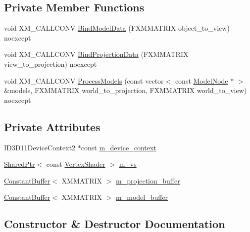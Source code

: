 \subsection*{Private Member Functions}
\begin{DoxyCompactItemize}
\item 
void X\+M\+\_\+\+C\+A\+L\+L\+C\+O\+NV \hyperlink{classmage_1_1_depth_pass_ae6662a200915bd6e6842d76f47abd6c4}{Bind\+Model\+Data} (F\+X\+M\+M\+A\+T\+R\+IX object\+\_\+to\+\_\+view) noexcept
\item 
void X\+M\+\_\+\+C\+A\+L\+L\+C\+O\+NV \hyperlink{classmage_1_1_depth_pass_a38ff8d33518769575a945f4908993eb0}{Bind\+Projection\+Data} (F\+X\+M\+M\+A\+T\+R\+IX view\+\_\+to\+\_\+projection) noexcept
\item 
void X\+M\+\_\+\+C\+A\+L\+L\+C\+O\+NV \hyperlink{classmage_1_1_depth_pass_a00a2eaabd0d0363cf58998a46688c490}{Process\+Models} (const vector$<$ const \hyperlink{classmage_1_1_model_node}{Model\+Node} $\ast$ $>$ \&models, F\+X\+M\+M\+A\+T\+R\+IX world\+\_\+to\+\_\+projection, F\+X\+M\+M\+A\+T\+R\+IX world\+\_\+to\+\_\+view) noexcept
\end{DoxyCompactItemize}
\subsection*{Private Attributes}
\begin{DoxyCompactItemize}
\item 
I\+D3\+D11\+Device\+Context2 $\ast$const \hyperlink{classmage_1_1_depth_pass_ab7e627aaf0356349e750e89c6b97c7a0}{m\+\_\+device\+\_\+context}
\item 
\hyperlink{namespacemage_a1e01ae66713838a7a67d30e44c67703e}{Shared\+Ptr}$<$ const \hyperlink{classmage_1_1_vertex_shader}{Vertex\+Shader} $>$ \hyperlink{classmage_1_1_depth_pass_a0db20d0e34ecd2cef5a70a46543be83f}{m\+\_\+vs}
\item 
\hyperlink{structmage_1_1_constant_buffer}{Constant\+Buffer}$<$ X\+M\+M\+A\+T\+R\+IX $>$ \hyperlink{classmage_1_1_depth_pass_a4c9833ceaf223b73404edab4cf81b7c1}{m\+\_\+projection\+\_\+buffer}
\item 
\hyperlink{structmage_1_1_constant_buffer}{Constant\+Buffer}$<$ X\+M\+M\+A\+T\+R\+IX $>$ \hyperlink{classmage_1_1_depth_pass_ad296948a2f4c2b08f18b897ff2d8b03c}{m\+\_\+model\+\_\+buffer}
\end{DoxyCompactItemize}


\subsection{Constructor \& Destructor Documentation}
\hypertarget{classmage_1_1_depth_pass_a16a23f6820a11faf9195b307474e355b}{}\label{classmage_1_1_depth_pass_a16a23f6820a11faf9195b307474e355b} 
